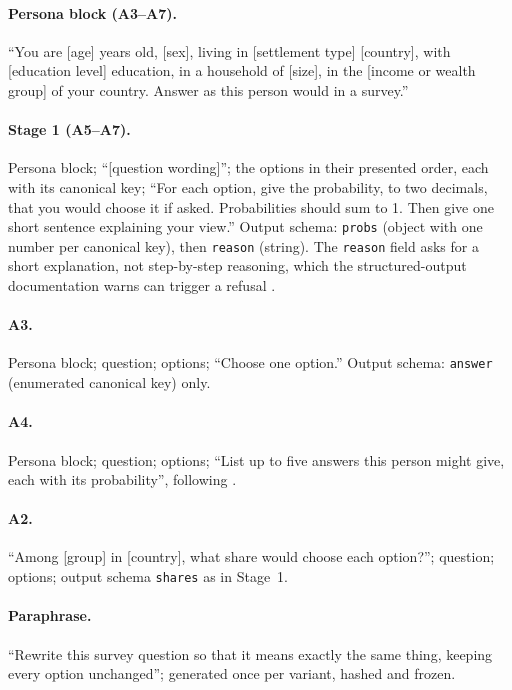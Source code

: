 \documentclass[11pt]{article}
\begin{document}
\paragraph{Persona block (A3--A7).} ``You are [age] years old, [sex], living in [settlement type] [country], with [education level] education, in a household of [size], in the [income or wealth group] of your country. Answer as this person would in a survey.''

\paragraph{Stage 1 (A5--A7).} Persona block; ``[question wording]''; the options in their presented order, each with its canonical key; ``For each option, give the probability, to two decimals, that you would choose it if asked. Probabilities should sum to 1. Then give one short sentence explaining your view.'' Output schema: \texttt{probs} (object with one number per canonical key), then \texttt{reason} (string). The \texttt{reason} field asks for a short explanation, not step-by-step reasoning, which the structured-output documentation warns can trigger a refusal \citep{anthropic2026structured}.

\paragraph{A3.} Persona block; question; options; ``Choose one option.'' Output schema: \texttt{answer} (enumerated canonical key) only.

\paragraph{A4.} Persona block; question; options; ``List up to five answers this person might give, each with its probability'', following \citet{zhang2025verbalized}.

\paragraph{A2.} ``Among [group] in [country], what share would choose each option?''; question; options; output schema \texttt{shares} as in Stage~1.

\paragraph{Paraphrase.} ``Rewrite this survey question so that it means exactly the same thing, keeping every option unchanged''; generated once per variant, hashed and frozen.
\end{document}
